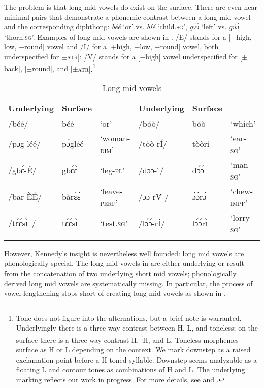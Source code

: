\documentclass[output=paper,newtxmath,modfonts,nonflat,draftmode]{langsci/langscibook}
\begin{document}
The problem is that long mid vowels do exist on the surface. There are even near-minimal pairs that demonstrate a phonemic contrast between a long mid vowel and the corresponding diphthong: \textit{béé} ‘or’ vs. \textit{bíé} ‘child.\textsc{sg}’, \textit{gɔ̀ɔ́} `left' vs. \textit{gúɔ̀} `thorn.\textsc{sg}'. Examples of long mid vowels are shown in . /E/ stands for a [$-$high, $-$low, $-$round] vowel and /I/ for a [+high, $-$low, $-$round] vowel, both underspecified for {$\pm$}{\textsc{atr}}{]; /V/ stands for a [$-$high] vowel underspecified for [$\pm$back], [$\pm$round], and [$\pm$}{\textsc{atr}}{].}\footnote{Tone does not figure into the  alternations, but a brief note is warranted. Underlyingly there is a three-way contrast between H, L, and toneless; on the surface there is a three-way contrast H, \textsuperscript{!}H, and L. Toneless morphemes surface as H or L depending on the context. We mark downstep as a raised exclamation point before a H toned syllable. Downstep seems analyzable as a floating L and contour tones as combinations of H and L. The underlying  marking reflects our work in progress. For more details, see \citet[42-49]{Kennedy1966} and \citet{Anttila&Bodomo2000}.}

\begin{table}
\begin{tabularx}{\textwidth}{llllll}
\lsptoprule
{Underlying} & {Surface} & & {Underlying} & {Surface} &\\
\midrule
/béé/ &	béé &	‘or’ &	/bóò/ &	bóò  &	‘which’\\
/pɔg-léé/ &	pɔ̀gléé &	‘woman-\textsc{dim}’ &	/tòò-rÍ/ &	tòòrí &	‘ear-\textsc{sg}’\\
/gbɛ́-É/ &	gbɛ́ɛ̀  &	‘leg-\textsc{pl}’ &	/dɔɔ- ́/ &	dɔ́ɔ́ &	‘man-\textsc{sg}’\\
/bar-ÈÉ/ &	bàrɛ̀ɛ́ &	‘leave-\textsc{perf}’ &	/ɔɔ-rV́ / &	ɔ̀ɔ̀rɔ́ &	‘chew-\textsc{impf}’\\
/tɛ́ɛ́sɪ̀ / &	tɛ́ɛ́sɪ̀  &	‘test.\textsc{sg}’ &	/lɔ́ɔ́-rÍ/ &	lɔ́ɔ́rɪ̀  &	‘lorry-\textsc{sg}’\\
\lspbottomrule
\end{tabularx}
\caption{Long mid vowels}
\label{tab:anttila:2}
\end{table}



{However, Kennedy’s insight is nevertheless well founded: long mid vowels are phonologically special.} {The long mid vowels in  are} {either underlying or result from the concatenation of two underlying short mid vowels; phonologically derived long mid vowels are systematically missing. In particular, the process of vowel lengthening stops short of creating long mid vowels as shown in .}
\end{document}
